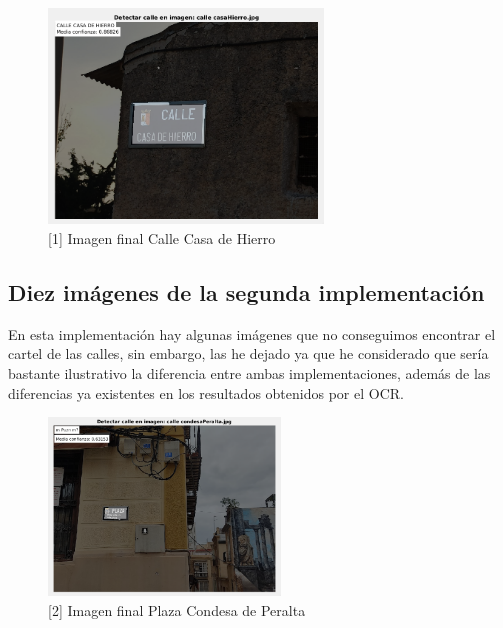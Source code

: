 \documentclass[12pt]{article}
\begin{document}
		\begin{figure}[h!]
			\begin{center}
				\includegraphics[width=0.65\textwidth]{img/1_10.png}
				\caption{[1] Imagen final Calle Casa de Hierro}
			\end{center}
		\end{figure}
	
	\pagebreak
	
	\subsection{Diez imágenes de la segunda implementación}
	\noindent En esta implementación hay algunas imágenes que no conseguimos encontrar el cartel de las calles, sin embargo, las he dejado ya que he considerado que sería bastante ilustrativo la diferencia entre ambas implementaciones, además de las diferencias ya existentes en los resultados obtenidos por el OCR.
	
	\begin{figure}[h!]
		\begin{center}
			\includegraphics[width=0.55\textwidth]{img/2_1.png}
			\caption{[2] Imagen final Plaza Condesa de Peralta}
		\end{center}
	\end{figure}
	
\end{document}
